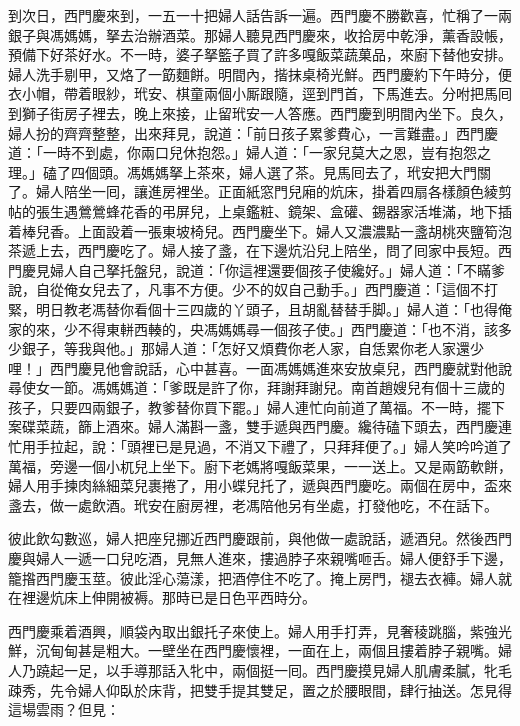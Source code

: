 到次日，西門慶來到，一五一十把婦人話告訴一遍。西門慶不勝歡喜，忙稱了一兩銀子與馮媽媽，拏去治辦酒菜。那婦人聽見西門慶來，收拾房中乾淨，薰香設帳，預備下好茶好水。不一時，婆子拏籃子買了許多嘎飯菜蔬菓品，來廚下替他安排。婦人洗手剔甲，又烙了一筯麵餅。明間內，揩抹桌椅光鮮。西門慶約下午時分，便衣小帽，帶着眼紗，玳安、棋童兩個小厮跟隨，逕到門首，下馬進去。分咐把馬囘到獅子街房子裡去，晚上來接，止留玳安一人答應。西門慶到明間內坐下。良久，婦人扮的齊齊整整，出來拜見，說道：「前日孩子累爹費心，一言難盡。」西門慶道：「一時不到處，你兩口兒休抱怨。」婦人道：「一家兒莫大之恩，豈有抱怨之理。」磕了四個頭。馮媽媽拏上茶來，婦人選了茶。見馬囘去了，玳安把大門關了。{}婦人陪坐一囘，讓進房裡坐。正面紙窓門兒廂的炕床，掛着四扇各樣顏色綾剪帖的張生遇鶯鶯蜂花香的弔屏兒，上桌鑑粧、鏡架、盒礶、錫器家活堆滿，地下插着棒兒香。{}上面設着一張東坡椅兒。{}西門慶坐下。婦人又濃濃點一盞胡桃夾鹽筍泡茶遞上去，西門慶吃了。婦人接了盞，在下邊炕沿兒上陪坐，問了囘家中長短。西門慶見婦人自己拏托盤兒，說道：「你這裡還要個孩子使纔好。」婦人道：「不瞞爹說，自從俺女兒去了，凡事不方便。少不的奴自己動手。」西門慶道：「這個不打緊，明日教老馮替你看個十三四歲的丫頭子，且胡亂替替手脚。」婦人道：「也得俺家的來，少不得東軿西輳的，{}央馮媽媽尋一個孩子使。」西門慶道：「也不消，該多少銀子，等我與他。」那婦人道：「怎好又煩費你老人家，自恁累你老人家還少哩！」西門慶見他會說話，心中甚喜。一面馮媽媽進來安放桌兒，西門慶就對他說尋使女一節。馮媽媽道：「爹既是許了你，拜謝拜謝兒。南首趙嫂兒有個十三歲的孩子，只要四兩銀子，教爹替你買下罷。」婦人連忙向前道了萬福。不一時，擺下案碟菜蔬，篩上酒來。婦人滿斟一盞，雙手遞與西門慶。纔待磕下頭去，西門慶連忙用手拉起，說：「頭裡已是見過，不消又下禮了，只拜拜便了。」婦人笑吟吟道了萬福，旁邊一個小杌兒上坐下。廚下老媽將嘎飯菜果，一一送上。又是兩筯軟餅，婦人用手揀肉絲細菜兒裹捲了，用小蝶兒托了，遞與西門慶吃。兩個在房中，盃來盞去，做一處飲酒。玳安在廚房裡，老馮陪他另有坐處，打發他吃，不在話下。

彼此飲勾數巡，婦人把座兒挪近西門慶跟前，{}與他做一處說話，遞酒兒。然後西門慶與婦人一遞一口兒吃酒，見無人進來，摟過脖子來親嘴咂舌。婦人便舒手下邊，籠揝西門慶玉莖。彼此淫心蕩漾，把酒停住不吃了。掩上房門，褪去衣褲。婦人就在裡邊炕床上伸開被褥。那時已是日色平西時分。

西門慶乘着酒興，順袋內取出銀托子來使上。婦人用手打弄，見奢稜跳腦，紫強光鮮，沉甸甸甚是粗大。一壁坐在西門慶懷裡，一面在上，兩個且摟着脖子親嘴。婦人乃蹺起一足，以手導那話入牝中，兩個挺一囘。西門慶摸見婦人肌膚柔膩，牝毛疎秀，先令婦人仰臥於床背，把雙手提其雙足，置之於腰眼間，肆行抽送。怎見得這場雲雨？但見：


